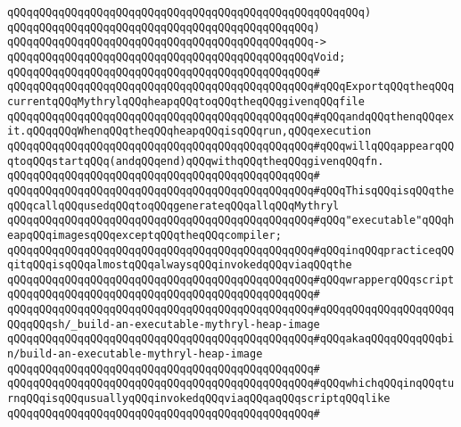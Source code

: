 \verb|qQQqqQQqqQQqqQQqqQQqqQQqqQQqqQQqqQQqqQQqqQQqqQQqqQQqqQQq)|\newline
\verb|qQQqqQQqqQQqqQQqqQQqqQQqqQQqqQQqqQQqqQQqqQQqqQQq)|\newline
\verb|qQQqqQQqqQQqqQQqqQQqqQQqqQQqqQQqqQQqqQQqqQQqqQQq->|\newline
\verb|qQQqqQQqqQQqqQQqqQQqqQQqqQQqqQQqqQQqqQQqqQQqqQQqVoid;|\newline
\verb|qQQqqQQqqQQqqQQqqQQqqQQqqQQqqQQqqQQqqQQqqQQqqQQq#|\newline
\verb|qQQqqQQqqQQqqQQqqQQqqQQqqQQqqQQqqQQqqQQqqQQqqQQq#qQQqExportqQQqtheqQQqcurrentqQQqMythrylqQQqheapqQQqtoqQQqtheqQQqgivenqQQqfile|\newline
\verb|qQQqqQQqqQQqqQQqqQQqqQQqqQQqqQQqqQQqqQQqqQQqqQQq#qQQqandqQQqthenqQQqexit.qQQqqQQqWhenqQQqtheqQQqheapqQQqisqQQqrun,qQQqexecution|\newline
\verb|qQQqqQQqqQQqqQQqqQQqqQQqqQQqqQQqqQQqqQQqqQQqqQQq#qQQqwillqQQqappearqQQqtoqQQqstartqQQq(andqQQqend)qQQqwithqQQqtheqQQqgivenqQQqfn.|\newline
\verb|qQQqqQQqqQQqqQQqqQQqqQQqqQQqqQQqqQQqqQQqqQQqqQQq#|\newline
\verb|qQQqqQQqqQQqqQQqqQQqqQQqqQQqqQQqqQQqqQQqqQQqqQQq#qQQqThisqQQqisqQQqtheqQQqcallqQQqusedqQQqtoqQQqgenerateqQQqallqQQqMythryl|\newline
\verb|qQQqqQQqqQQqqQQqqQQqqQQqqQQqqQQqqQQqqQQqqQQqqQQq#qQQq"executable"qQQqheapqQQqimagesqQQqexceptqQQqtheqQQqcompiler;|\newline
\verb|qQQqqQQqqQQqqQQqqQQqqQQqqQQqqQQqqQQqqQQqqQQqqQQq#qQQqinqQQqpracticeqQQqitqQQqisqQQqalmostqQQqalwaysqQQqinvokedqQQqviaqQQqthe|\newline
\verb|qQQqqQQqqQQqqQQqqQQqqQQqqQQqqQQqqQQqqQQqqQQqqQQq#qQQqwrapperqQQqscript|\newline
\verb|qQQqqQQqqQQqqQQqqQQqqQQqqQQqqQQqqQQqqQQqqQQqqQQq#|\newline
\verb|qQQqqQQqqQQqqQQqqQQqqQQqqQQqqQQqqQQqqQQqqQQqqQQq#qQQqqQQqqQQqqQQqqQQqqQQqqQQqsh/_build-an-executable-mythryl-heap-image|\newline
\verb|qQQqqQQqqQQqqQQqqQQqqQQqqQQqqQQqqQQqqQQqqQQqqQQq#qQQqakaqQQqqQQqqQQqbin/build-an-executable-mythryl-heap-image|\newline
\verb|qQQqqQQqqQQqqQQqqQQqqQQqqQQqqQQqqQQqqQQqqQQqqQQq#|\newline
\verb|qQQqqQQqqQQqqQQqqQQqqQQqqQQqqQQqqQQqqQQqqQQqqQQq#qQQqwhichqQQqinqQQqturnqQQqisqQQqusuallyqQQqinvokedqQQqviaqQQqaqQQqscriptqQQqlike|\newline
\verb|qQQqqQQqqQQqqQQqqQQqqQQqqQQqqQQqqQQqqQQqqQQqqQQq#|\newline

